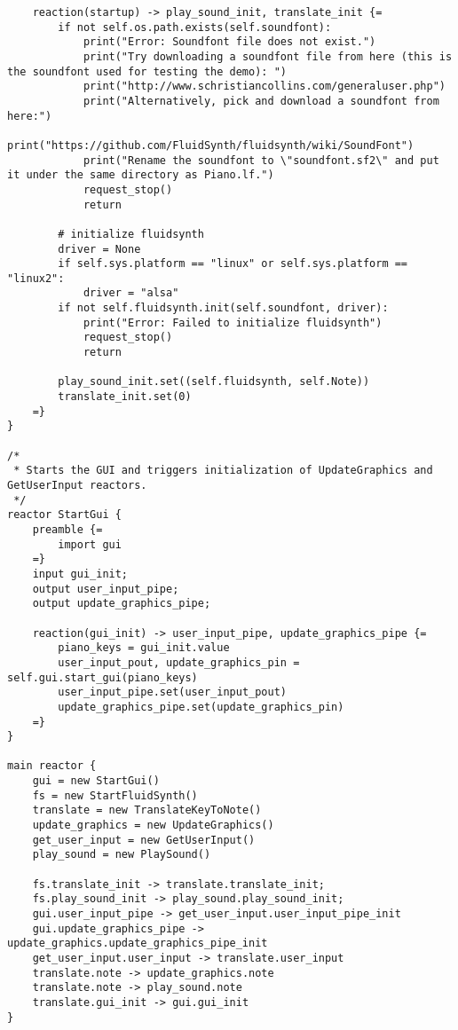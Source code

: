 \documentclass{article}
\begin{document}
\begin{verbatim}
    reaction(startup) -> play_sound_init, translate_init {=
        if not self.os.path.exists(self.soundfont):
            print("Error: Soundfont file does not exist.")
            print("Try downloading a soundfont file from here (this is the soundfont used for testing the demo): ")
            print("http://www.schristiancollins.com/generaluser.php")
            print("Alternatively, pick and download a soundfont from here:")
            print("https://github.com/FluidSynth/fluidsynth/wiki/SoundFont")
            print("Rename the soundfont to \"soundfont.sf2\" and put it under the same directory as Piano.lf.")
            request_stop() 
            return

        # initialize fluidsynth
        driver = None
        if self.sys.platform == "linux" or self.sys.platform == "linux2":
            driver = "alsa"
        if not self.fluidsynth.init(self.soundfont, driver):
            print("Error: Failed to initialize fluidsynth")
            request_stop()
            return
            
        play_sound_init.set((self.fluidsynth, self.Note))
        translate_init.set(0)
    =}
}

/*
 * Starts the GUI and triggers initialization of UpdateGraphics and GetUserInput reactors.
 */
reactor StartGui {
    preamble {=
        import gui
    =}
    input gui_init;
    output user_input_pipe;
    output update_graphics_pipe;
    
    reaction(gui_init) -> user_input_pipe, update_graphics_pipe {=
        piano_keys = gui_init.value
        user_input_pout, update_graphics_pin = self.gui.start_gui(piano_keys)
        user_input_pipe.set(user_input_pout)
        update_graphics_pipe.set(update_graphics_pin)
    =}
}

main reactor {
    gui = new StartGui()
    fs = new StartFluidSynth()
    translate = new TranslateKeyToNote()
    update_graphics = new UpdateGraphics()
    get_user_input = new GetUserInput() 
    play_sound = new PlaySound()
    
    fs.translate_init -> translate.translate_init;
    fs.play_sound_init -> play_sound.play_sound_init;
    gui.user_input_pipe -> get_user_input.user_input_pipe_init
    gui.update_graphics_pipe -> update_graphics.update_graphics_pipe_init
    get_user_input.user_input -> translate.user_input
    translate.note -> update_graphics.note
    translate.note -> play_sound.note
    translate.gui_init -> gui.gui_init
}
\end{verbatim}
\end{document}
